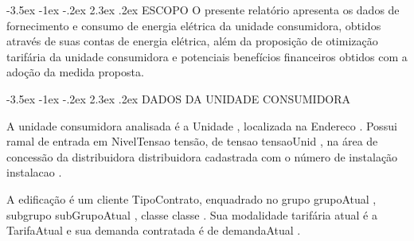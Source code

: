 \documentclass[a4paper,12pt]{abntex2}
\makeatletter
\renewcommand\chapter{\@startsection{chapter}{0}{\z@}%
  {-3.5ex \@plus -1ex \@minus -.2ex}%
  {2.3ex \@plus.2ex}%
  {\normalfont\large\bfseries}}
\renewcommand{\arraystretch}{1.3}
\makeatother
\begin{document}
    \begin{table}[!ht]
        \centering
        \setlength{\tabcolsep}{5pt}
        \renewcommand{\arraystretch}{1.3}
    \end{table} 
    \vfill
    
    \newpage

\chapter{ESCOPO}
O presente relatório apresenta os dados de fornecimento e consumo de energia elétrica da unidade consumidora, obtidos através de suas contas de energia elétrica, além da proposição de otimização tarifária da unidade consumidora e potenciais benefícios financeiros obtidos com a adoção da medida proposta.

\chapter{DADOS DA UNIDADE CONSUMIDORA}

A unidade consumidora analisada é a {{ Unidade }}, localizada na {{ Endereco }}. Possui ramal de entrada em {{ NivelTensao }} tensão, de {{ tensao }} {{ tensaoUnid }}, na área de concessão da distribuidora {{ distribuidora }} cadastrada com o número de instalação {{ instalacao }}.

A edificação  é  um  cliente  {{TipoContrato}}, enquadrado no grupo {{ grupoAtual }}, subgrupo {{ subGrupoAtual }}, classe {{ classe }}. Sua modalidade tarifária atual é a {{ TarifaAtual }} e sua demanda contratada é de {{ demandaAtual }}.
\end{document}
